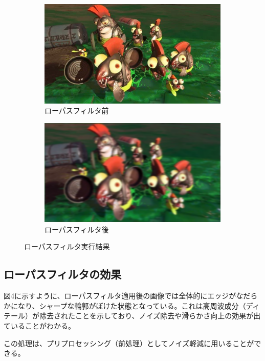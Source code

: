\documentclass[a4paper,11pt,titlepage]{jsarticle}
\begin{document}
\begin{figure}[htbp]
  \centering

  \begin{subfigure}{0.4\textwidth}
    \includegraphics[width=\linewidth]{syake_image.png}
    \caption{ローパスフィルタ前}
  \end{subfigure}
  \hfill
  \begin{subfigure}{0.4\textwidth}
    \includegraphics[width=\linewidth]{syake_lowpass_filter.png}
    \caption{ローパスフィルタ後}
  \end{subfigure}

  \caption{ローパスフィルタ実行結果}
\end{figure}

\subsection{ローパスフィルタの効果}

図4に示すように、ローパスフィルタ適用後の画像では全体的にエッジがなだらかになり、シャープな輪郭がぼけた状態となっている。これは高周波成分（ディテール）が除去されたことを示しており、ノイズ除去や滑らかさ向上の効果が出ていることがわかる。

この処理は、プリプロセッシング（前処理）としてノイズ軽減に用いることができる。
\end{document}
